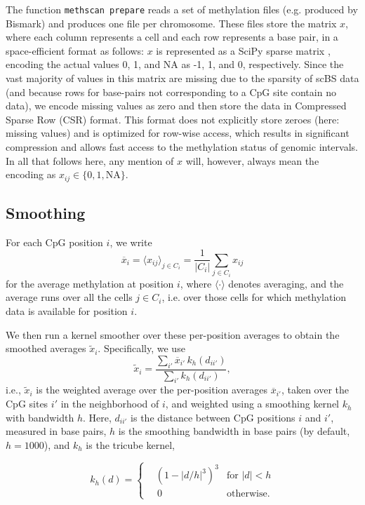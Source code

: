 \documentclass[10pt]{article}
\begin{document}
The function \texttt{methscan prepare} reads a set of methylation files (e.g. produced by Bismark) and produces one file per chromosome.
These files store the matrix $x$, where each column represents a cell and each row represents a base pair, in a space-efficient format as follows:
$x$ is represented as a SciPy sparse matrix \citep{SciPy}, encoding the actual values 0, 1, and NA as -1, 1, and 0, respectively.
Since the vast majority of values in this matrix are missing due to the sparsity of scBS data (and because rows for base-pairs not corresponding to a CpG site contain no data), we encode missing values as zero and then store the data in Compressed Sparse Row (CSR) format.
This format does not explicitly store zeroes (here: missing values) and is optimized for row-wise access, which results in significant compression and allows fast access to the methylation status of genomic intervals.
In all that follows here, any mention of $x$ will, however, always mean the encoding as $x_{ij}\in\{0,1,\text{NA}\}$.

\subsection*{Smoothing}

For each CpG position $i$, we write 
\[\overline{x}_i=\langle x_{ij} \rangle_{j\in C_i} = \frac{1}{|C_i|}\sum_{j\in C_i} x_{ij}\] 
for the average methylation at position $i$, where $\langle\cdot\rangle$ denotes averaging, and the average runs over all the cells $j\in C_i$, i.e.
over those cells for which methylation data is available for position $i$.

We then run a kernel smoother over these per-position averages to obtain the smoothed averages $\tilde x_i$.
Specifically, we use
\[ \tilde x_i = \frac{\sum_{i'} \overline x_{i'}\, k_h(d_{ii'})}{\sum_{i'} k_h(d_{ii'})},\]
i.e., $\tilde x_i$ is the weighted average over the per-position averages $\overline{x}_{i'}$, taken over the CpG sites $i'$ in the neighborhood of $i$, and weighted using a smoothing kernel $k_h$ with bandwidth $h$.
Here, $d_{ii'}$ is the distance between CpG positions $i$ and $i'$, measured in base pairs, $h$ is the smoothing bandwidth in base pairs (by default, $h=1000$), and $k_h$ is the tricube kernel,

\[ k_h(d) = \left\{
\begin{aligned}
    &\left(1-|d/h|^3\right)^3 &\text{for } |d|<h \\
    &\,0 &\text{otherwise}.
\end{aligned}
\right.
\]
\end{document}
